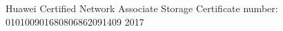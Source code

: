 

\begin{cvcertifications}
	
	\cvcertification
		{Huawei Certified Network Associate Storage} %
		{Certificate number: 010100901680806862091409} %
		{2017} %
	
\end{cvcertifications}